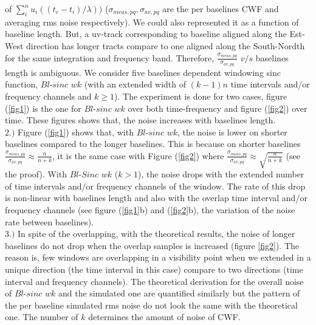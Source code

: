 \documentclass[useAMS,usenatbib]{mn2e}
\begin{document}
of $\sum_{i}^{n} u_i((t_c-t_i)/\lambda))$ ($\sigma_{meas,pq},\sigma_{av,pq}$ are the per baselines CWF and averaging rms noise  
respectively). We could also represented it as a function of baseline length. But, a uv-track corresponding to baseline aligned along the 
Est-West direction has longer tracts compare to one aligned along the South-Nordth for the same integration and frequency band. Therefore,  
$\frac{\sigma_{meas,pq}}{\sigma_{av,pq}}$ $v/s$ baselines length is ambiguous. We consider five baselines dependent 
windowing sinc function, $Bl$-$sinc$ $wk$ (with an extended width of $(k-1)n$ time intervals and/or frequency channels and $k \geq 1$). The 
experiment is done for two cases, figure (\ref{fig1}) is the one for $Bl$-$sinc$ $wk$ over both time-frequency and figure (\ref{fig2}) over 
time. These figures shows that, the noise increases with baselines length.\\
$2.)$ Figure (\ref{fig1}) shows that, with $Bl$-$sinc$ $wk$, the noise is lower on shorter baselines compared to the longer baselines. This 
is because on shorter  baselines  $\frac{\sigma_{meas,pq}}{\sigma_{av,pq}} \approx \frac{n}{n + k}$, it is the same case with 
Figure (\ref{fig2}) where $\frac{\sigma_{meas,pq}}{\sigma_{av,pq}} \approx \sqrt{\frac{n}{n + k}}$ (see the proof).  With $Bl$-$Sinc$ $wk$ 
($k>1$), the noise drops  with the extended number of time intervals and/or frequency channels of 
the window. The rate of this drop is non-linear with baselines length and also with the overlap time interval and/or frequency channels 
(see figure (\ref{fig1}b) and (\ref{fig2}b), the variation of the noise rate between baselines).  \\
$3.)$ In spite of the overlapping, with the theoretical results, the noise of longer baselines do not drop when the overlap 
samples is increased (figure \ref{fig2}). The reason is, few windows are overlapping in a visibility point when we extended in a unique 
direction (the time interval in this case) compare to two directions (time interval and frequency channels). 
The theoretical derivation for the overall noise of $Bl$-$sinc$ $wk$ and the simulated one are quantified similarly but the pattern of the  
per baseline simulated rms noise do not look the same with the theoretical one. The number of $k$ determines the amount of noise  of CWF.
\end{document}
